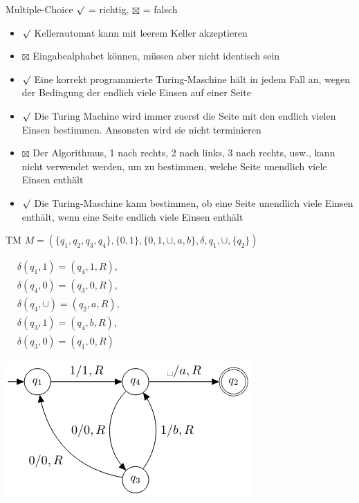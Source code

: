 \begin{example2}{Multiple-Choice} $\surd$ = richtig, $\boxtimes$ = falsch
    \begin{itemize}
        \item $\surd$ Kellerautomat kann mit leerem Keller akzeptieren
        \item $\boxtimes$ Eingabealphabet können, müssen aber nicht identisch sein 
        \item $\surd$ Eine korrekt programmierte Turing-Maschine hält in jedem Fall an, wegen der Bedingung der endlich viele Einsen auf einer Seite
        \item $\surd$ Die Turing Machine wird immer zuerst die Seite mit den endlich vielen Einsen bestimmen. Ansonsten wird sie nicht terminieren
        \item $\boxtimes$ Der Algorithmus, 1 nach rechts, 2 nach links, 3 nach rechts, usw., kann nicht verwendet werden, um zu bestimmen, welche Seite unendlich viele Einsen enthält
        \item $\surd$ Die Turing-Maschine kann bestimmen, ob eine Seite unendlich viele Einsen enthält, wenn eine Seite endlich viele Einsen enthält
    \end{itemize}
\end{example2}


\begin{example2}
    {TM} $M=(\{q_1, q_2, q_3, q_4\},\{0,1\},\{0,1, \cup, a, b\}, \delta, q_1, \cup,\{q_2\})$ 
    
    \begin{minipage}{0.35\linewidth}
    $
    \begin{aligned}
    & \delta(q_1, 1)=(q_4, 1, R), \\
    & \delta(q_4, 0)=(q_3, 0, R), \\
    & \delta(q_4, \cup)=(q_2, a, R), \\
    & \delta(q_3, 1)=(q_4, b, R), \\
    & \delta(q_3, 0)=(q_1, 0, R)
    \end{aligned}
    $
\end{minipage}
\begin{minipage}{0.6\linewidth}
    \includegraphics[width=0.9\linewidth]{images/turingmaschine_bsp.png}
\end{minipage}
\end{example2}



